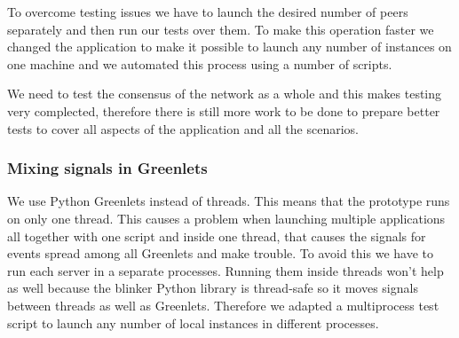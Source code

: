 To overcome testing issues we have to launch the desired number of peers separately and then run our tests 
over them. To make this operation faster we changed the application to make it possible to launch any number
of instances on one machine and we automated this process using a number of scripts. %

We need to test the consensus of the network as a whole and this makes testing very complected, therefore
there is still more work to be done to prepare better tests to cover all aspects of the application and all
the scenarios.

\subsubsection{Mixing signals in Greenlets}
We use Python Greenlets instead of threads. This means that the prototype runs on only one thread. 
This causes a problem when launching multiple applications all together with one script and inside one thread, that
causes the signals for events spread among all Greenlets and make trouble. To avoid this we have to run
each server in a separate processes. Running them inside threads won't help as well because the blinker Python
library is thread-safe so it moves signals between threads as well as Greenlets. Therefore we adapted a multiprocess
test script to launch any number of local instances in different processes.